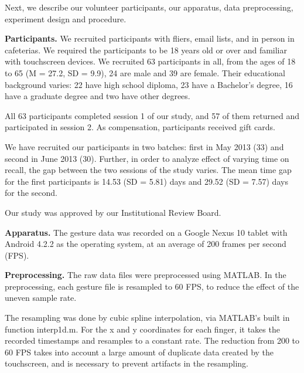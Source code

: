 \documentclass{sig-alternate-10pt}
\begin{document}
Next, we describe our volunteer participants, our apparatus, data preprocessing, experiment design and procedure.

\textbf{Participants.} We recruited participants with fliers, email lists, and in person in cafeterias. We required the participants to be 18 years old or over and familiar with touchscreen devices. We recruited 63 participants in all, from the ages of 18 to 65 (M = 27.2, SD = 9.9), 24 are male and 39 are female. Their educational background varies: 22 have high school diploma, 23 have a Bachelor's degree, 16 have a graduate degree and two have other degrees. 

All 63 participants completed session 1 of our study, and 57 of them returned and participated in session 2.
As compensation, participants received  gift cards.

We have recruited our participants in two batches: first in May 2013 (33) and second in June 2013 (30). Further, in order to analyze effect of varying time on recall, the gap between the two sessions of the study varies. The mean time gap for the first participants is 14.53 (SD = 5.81) days and 29.52 (SD = 7.57) days for the second.


Our study was approved by our Institutional Review Board.




\textbf{Apparatus.} The gesture data was recorded on a Google Nexus 10 tablet with Android 4.2.2 as the operating system, at an average of 200 frames per second (FPS).






















\textbf{Preprocessing.} The raw data files were preprocessed using MATLAB. In the preprocessing,  each gesture file is resampled to 60 FPS, to reduce the effect of the uneven sample rate. 



The resampling was done by cubic spline interpolation, via MATLAB's built in function interp1d.m. For the x and y coordinates for each finger, it takes the recorded timestamps and resamples to a constant rate. The reduction from 200 to 60 FPS takes into account a large amount of duplicate data created by the touchscreen, and is necessary to prevent artifacts in the resampling. 
\end{document}
